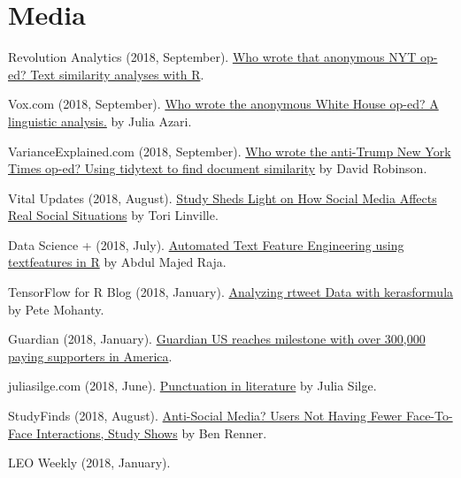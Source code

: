 \section{Media}
  \begin{bibenum}
    \item[] Revolution Analytics (2018, September).
      \href{http://blog.revolutionanalytics.com/2018/09/anonymous-nyt-op-ed.html}{Who wrote that anonymous NYT op-ed? Text similarity analyses with R}.
    \item[] Vox.com (2018, September).
      \href{https://www.vox.com/mischiefs-of-faction/2018/9/7/17830304/who-wrote-anonymous-white-house-op-ed}{Who wrote the anonymous White House op-ed? A linguistic analysis.} by Julia Azari.
    \item[] VarianceExplained.com (2018, September).
      \href{http://varianceexplained.org/r/op-ed-text-analysis/}{Who wrote the anti-Trump New York Times op-ed? Using tidytext to find document similarity} by David Robinson.
    \item[] Vital Updates (2018, August).
      \href{https://vitalupdates.com/study-sheds-light-on-how-social-media-affects-real-social-situations/}{Study Sheds Light on How Social Media Affects Real Social Situations} by Tori Linville.
    \item[] Data Science {+} (2018, July).
      \href{https://datascienceplus.com/automated-text-feature-engineering-using-textfeatures-in-r/}{Automated Text Feature Engineering using textfeatures in R} by Abdul Majed Raja.
    \item[] TensorFlow for R Blog (2018, January).
      \href{https://blogs.rstudio.com/tensorflow/posts/2018-01-24-analyzing-rtweet-data-with-kerasformula/}{Analyzing rtweet Data with kerasformula} by Pete Mohanty.
    \item[] Guardian (2018, January).
      \href{https://www.theguardian.com/gnm-press-office/2018/jan/26/guardian-us-reaches-milestone-with-over-300000-paying-supporters-in-america}{Guardian US reaches milestone with over 300,000 paying supporters in America}.
    \item[] juliasilge.com (2018, June).
      \href{https://juliasilge.com/blog/punctution-literature/}{Punctuation in literature} by Julia Silge.
    \item[] StudyFinds (2018, August).
      \href{https://www.studyfinds.org/social-media-not-decrease-face-face-interaction-study-says/}{Anti-Social Media? Users Not Having Fewer Face-To-Face Interactions, Study Shows} by Ben Renner.
    \item[] LEO Weekly (2018, January).

\end{bibenum}
